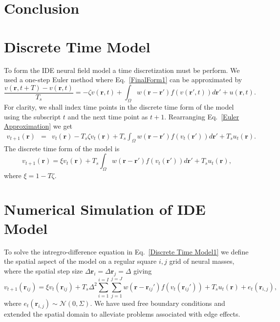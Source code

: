 \documentclass[12pt]{iopart}
\begin{document}
\section{Conclusion} 
\appendix 
\section{Discrete Time Model}\label{Time Discretization} To form the IDE neural field model a time discretization must be perform. We used a one-step Euler method where Eq.~\ref{FinalForm1} can be approximated by 
\begin{equation}
	\label{Euler Approximation} \frac{v\left( \mathbf{r},t+T \right) - v\left( \mathbf{r},t\right)}{T_s} = -\zeta v\left( \mathbf{r},t \right) + \int_\Omega {w\left( \mathbf{r}-\mathbf{r}' \right)f\left( {v\left( \mathbf{r}',t \right)} \right)d\mathbf{r}'} + u\left(\mathbf{r},t\right). 
\end{equation}
For clarity, we shall index time points in the discrete time form of the model using the subscript $t$ and the next time point as $t+1$. Rearranging Eq.~\ref{Euler Approximation} we get 
\begin{eqnarray}
	\label{Euler Approximation} v_{t+1}\left( \mathbf{r}\right) &=& v_t\left( \mathbf{r}\right) -T_s \zeta v_t\left( \mathbf{r}\right) + T_s \int_\Omega {w\left( \mathbf{r}-\mathbf{r}' \right)f\left( {v_t\left( \mathbf{r}'\right)} \right)d\mathbf{r}'} + T_s u_t\left(\mathbf{r}\right). 
\end{eqnarray}
The discrete time form of the model is 
\begin{equation}
	\label{Discrete Time Model1} v_{t+1}\left(\mathbf{r}\right) = \xi v_t\left(\mathbf{r}\right) + T_s \int_\Omega { w\left(\mathbf{r}-\mathbf{r}'\right) f\left(v_t\left(\mathbf{r}'\right)\right) d\mathbf{r}'} + T_s u_t\left(\mathbf{r}\right), 
\end{equation}
where $\xi = 1 - T \zeta$. 
\section{Numerical Simulation of IDE Model}\label{Space Discretization} To solve the intregro-difference equation in Eq.~\ref{Discrete Time Model1} we define the spatial aspect of the model on a regular square $i,j$ grid of neural masses, where the spatial step size $\Delta \mathbf{r}_i = \Delta \mathbf{r}_j = \Delta $ giving 
\begin{equation}
	\label{discrete space} v_{t+1}\left(\mathbf{r}_{ij}\right) = \xi v_t\left(\mathbf{r}_{ij}\right) + T_s \Delta^2 \sum_{i=1}^{i=I}{ \sum_{j=1}^{j=J}{ w\left( \mathbf{r}-\mathbf{r}_{ij}' \right)f\left( v_t\left( \mathbf{r}_{ij}'\right) \right)} } + T_s u_t\left(\mathbf{r}\right) + e_t(\mathbf{r}_{i,j}), 
\end{equation}
where $e_t(\mathbf{r}_{i,j}) \sim \mathcal{N}\left(0,\Sigma\right)$. We have used free boundary conditions and extended the spatial domain to alleviate problems associated with edge effects. 
\end{document}
